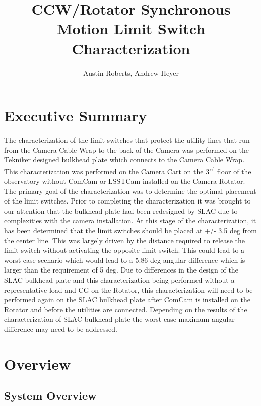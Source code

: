 \documentclass[SE,lsstdraft,authoryear,toc]{lsstdoc}
\title{CCW/Rotator Synchronous Motion Limit Switch Characterization}
\author{%
Austin Roberts, Andrew Heyer
}
\date{\vcsDate}
\begin{document}
\maketitle


\section{Executive Summary}

The characterization of the limit switches that protect the utility
lines that run from the Camera Cable Wrap to the back of the Camera was
performed on the Tekniker designed bulkhead plate which connects to the
Camera Cable Wrap. This characterization was performed on the Camera
Cart on the 3\textsuperscript{rd} floor of the observatory without
ComCam or LSSTCam installed on the Camera Rotator. The primary goal of
the characterization was to determine the optimal placement of the limit
switches. Prior to completing the characterization it was brought to our
attention that the bulkhead plate had been redesigned by SLAC due to
complexities with the camera installation. At this stage of the
characterization, it has been determined that the limit switches should
be placed at +/- 3.5 deg from the center line. This was largely driven
by the distance required to release the limit switch without activating
the opposite limit switch. This could lead to a worst case scenario
which would lead to a 5.86 deg angular difference which is larger than
the requirement of 5 deg. Due to differences in the design of the SLAC
bulkhead plate and this characterization being performed without a
representative load and CG on the Rotator, this characterization will
need to be performed again on the SLAC bulkhead plate after ComCam is
installed on the Rotator and before the utilities are connected.
Depending on the results of the characterization of SLAC bulkhead plate
the worst case maximum angular difference may need to be addressed.

\section{Overview}

\subsection{System Overview}
\end{document}
